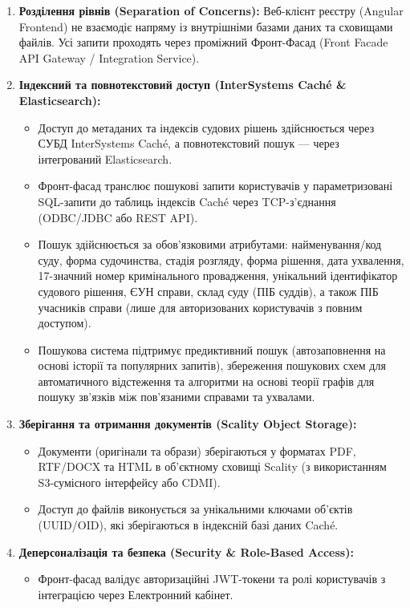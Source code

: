\documentclass{article}
\begin{document}
\begin{enumerate}
    \item \textbf{Розділення рівнів (Separation of Concerns):} Веб-клієнт реєстру (Angular Frontend) не взаємодіє напряму із внутрішніми базами даних та сховищами файлів. Усі запити проходять через проміжний Фронт-Фасад (Front Facade API Gateway / Integration Service).
    \item \textbf{Індексний та повнотекстовий доступ (InterSystems Caché \& Elasticsearch):} 
    \begin{itemize}
        \item Доступ до метаданих та індексів судових рішень здійснюється через СУБД InterSystems Caché, а повнотекстовий пошук — через інтегрований Elasticsearch.
        \item Фронт-фасад транслює пошукові запити користувачів у параметризовані SQL-запити до таблиць індексів Caché через TCP-з'єднання (ODBC/JDBC або REST API).
        \item Пошук здійснюється за обов'язковими атрибутами: найменування/код суду, форма судочинства, стадія розгляду, форма рішення, дата ухвалення, 17-значний номер кримінального провадження, унікальний ідентифікатор судового рішення, ЄУН справи, склад суду (ПІБ суддів), а також ПІБ учасників справи (лише для авторизованих користувачів з повним доступом).
        \item Пошукова система підтримує предиктивний пошук (автозаповнення на основі історії та популярних запитів), збереження пошукових схем для автоматичного відстеження та алгоритми на основі теорії графів для пошуку зв'язків між пов'язаними справами та ухвалами.
    \end{itemize}
    \item \textbf{Зберігання та отримання документів (Scality Object Storage):}
    \begin{itemize}
        \item Документи (оригінали та образи) зберігаються у форматах PDF, RTF/DOCX та HTML в об'єктному сховищі Scality (з використанням S3-сумісного інтерфейсу або CDMI).
        \item Доступ до файлів виконується за унікальними ключами об'єктів (UUID/OID), які зберігаються в індексній базі даних Caché.
    \end{itemize}
    \item \textbf{Деперсоналізація та безпека (Security \& Role-Based Access):}
    \begin{itemize}
        \item Фронт-фасад валідує авторизаційні JWT-токени та ролі користувачів з інтеграцією через Електронний кабінет.

\end{itemize}
\end{enumerate}
\end{document}
